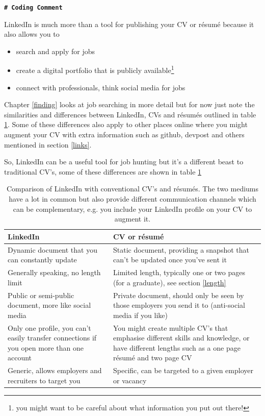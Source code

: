 \documentclass[
]{book}
\providecommand{\tightlist}{%
  \setlength{\itemsep}{0pt}\setlength{\parskip}{0pt}}
\begin{document}
\textbf{\texttt{\#\ Coding\ Comment}}

LinkedIn is much more than a tool for publishing your CV or résumé because it also allows you to

\begin{itemize}
\tightlist
\item
  search and apply for jobs
\item
  create a digital portfolio that is publicly available\footnote{you might want to be careful about what information you put out there!}
\item
  connect with professionals, think social media for jobs
\end{itemize}

Chapter \ref{finding} looks at job searching in more detail but for now just note the similarities and differences between LinkedIn, CVs and résumés outlined in table \ref{tab:linkedintable}. Some of these differences also apply to other places online where you might augment your CV with extra information such as github, devpost and others mentioned in section \ref{links}.

So, LinkedIn can be a useful tool for job hunting but it's a different beast to traditional CV's, some of these differences are shown in table \ref{tab:linkedintable}

\begin{table}

\caption{\label{tab:linkedintable}Comparison of LinkedIn with conventional CV's and résumés. The two mediums have a lot in common but also provide different communication channels which can be complementary, e.g. you include your LinkedIn profile on your CV to augment it.}
\centering
\begin{tabular}[t]{ll}
\toprule
LinkedIn & CV or résumé\\
\midrule
Dynamic document that you can constantly update & Static document, providing a snapshot that can't be updated once you've  sent it\\
Generally speaking, no length limit & Limited length, typically one or two pages (for a graduate), see section \ref{length}\\
Public or semi-public document, more like social media & Private document, should only be seen by those employers you send it to (anti-social media if you like)\\
Only one profile, you can't easily transfer connections if you open more than one account & You might create multiple CV's that emphasise different skills and knowledge, or have different lengths such as a one page résumé and two page CV\\
Generic, allows employers and recruiters to target you & Specific, can be targeted to a given employer or vacancy\\
\bottomrule
\end{tabular}
\end{table}
\end{document}
